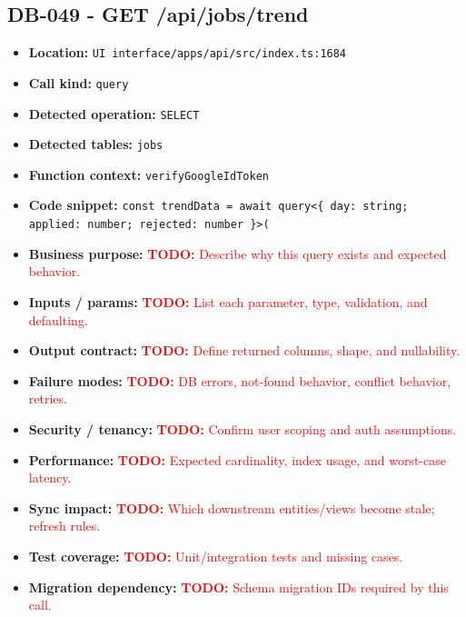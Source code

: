 \documentclass[11pt]{article}
\newcommand{\todoitem}[1]{\textcolor{red}{\textbf{TODO:} #1}}
\begin{document}
\subsection{DB-049 - GET /api/jobs/trend}
\begin{itemize}[leftmargin=1.5em]
\item \textbf{Location:} \texttt{UI interface/apps/api/src/index.ts:1684}
\item \textbf{Call kind:} \texttt{query}
\item \textbf{Detected operation:} \texttt{SELECT}
\item \textbf{Detected tables:} \texttt{jobs}
\item \textbf{Function context:} \texttt{verifyGoogleIdToken}
\item \textbf{Code snippet:} \texttt{const trendData = await query<\{ day: string; applied: number; rejected: number \}>(}
\item \textbf{Business purpose:} \todoitem{Describe why this query exists and expected behavior.}
\item \textbf{Inputs / params:} \todoitem{List each parameter, type, validation, and defaulting.}
\item \textbf{Output contract:} \todoitem{Define returned columns, shape, and nullability.}
\item \textbf{Failure modes:} \todoitem{DB errors, not-found behavior, conflict behavior, retries.}
\item \textbf{Security / tenancy:} \todoitem{Confirm user scoping and auth assumptions.}
\item \textbf{Performance:} \todoitem{Expected cardinality, index usage, and worst-case latency.}
\item \textbf{Sync impact:} \todoitem{Which downstream entities/views become stale; refresh rules.}
\item \textbf{Test coverage:} \todoitem{Unit/integration tests and missing cases.}
\item \textbf{Migration dependency:} \todoitem{Schema migration IDs required by this call.}
\end{itemize}
\end{document}
